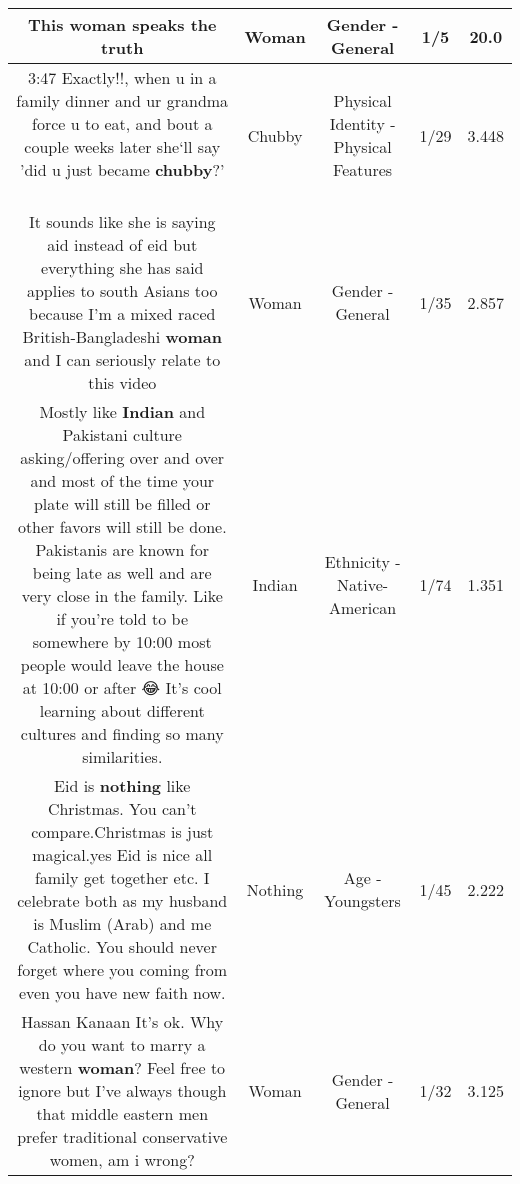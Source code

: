 \documentclass[11pt]{article}
\newlength\mylength
\begin{document}
\begin{center}
\begin{longtable}{|C{.65\mylength}|C{.30\mylength}|C{.12\mylength}|C{.12\mylength}|C{.12\mylength}|}
  \small This \textbf{woman} speaks the truth\normalsize   & Woman & Gender - General & 1/5 & 20.0 \\  \hline
  \small 3:47 Exactly!!, when u in a family dinner and ur grandma force u to eat, and bout a couple weeks later she‘ll say 'did u just became \textbf{chubby}?' 🙂🙂💔\normalsize   & Chubby & Physical Identity - Physical Features & 1/29 & 3.448 \\  \hline
  \small It sounds like she is saying aid instead of eid but everything she has said applies to south Asians too because I'm a mixed raced British-Bangladeshi \textbf{woman} and I can seriously relate to this video\normalsize   & Woman & Gender - General & 1/35 & 2.857 \\  \hline
  \small Mostly like \textbf{Indian} and Pakistani culture asking/offering over and over and most of the time your plate will still be filled or other favors will still be done. Pakistanis are known for being late as well and are very close in the family. Like if you're told to be somewhere by 10:00 most people would leave the house at 10:00 or after 😂 It's cool learning about different cultures and finding so many similarities.\normalsize   & Indian & Ethnicity - Native-American & 1/74 & 1.351 \\  \hline
  \small Eid is \textbf{nothing} like Christmas. You can't compare.Christmas is just magical.yes Eid is nice all family get together etc. I celebrate both as my husband is Muslim (Arab) and me Catholic. You should never forget where you coming from even you have new faith now.\normalsize   & Nothing & Age - Youngsters & 1/45 & 2.222 \\  \hline
  \small Hassan Kanaan It's ok. Why do you want to marry a western \textbf{woman}? Feel free to ignore but I've always though that middle eastern men prefer traditional conservative women, am i wrong?\normalsize   & Woman & Gender - General & 1/32 & 3.125 \\  \hline

\end{longtable}
\end{center}
\end{document}

